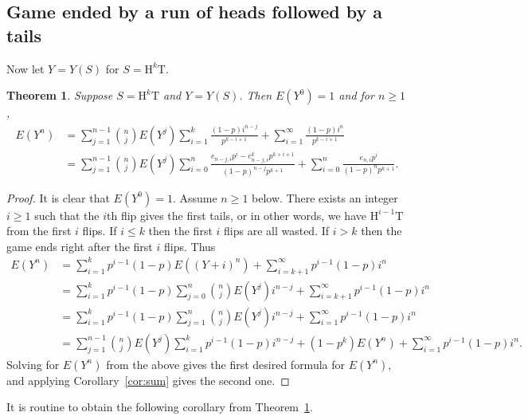 \documentclass[10pt]{amsart}
\newtheorem{theorem}{Theorem}[section]
\theoremstyle{definition}
\theoremstyle{remark}
\newcommand{\HH}{\mathrm{H}} \newcommand{\TT}{\mathrm{T}}
\begin{document}
\subsection{Game ended by a run of heads followed by a tails}
Now let $Y=Y(S)$ for $S=\HH^k\TT$. %


\begin{theorem}\label{thm:HkT}
Suppose $S=\HH^k\TT$ and $Y=Y(S)$. 
Then $E(Y^0)=1$ and for $n\ge1$, 
\begin{align*}
E(Y^n) &= \sum_{j=1}^{n-1} \binom{n}{j} E(Y^j) \sum_{i=1}^k \frac{(1-p) i^{n-j}}{p^{k-i+1}}
+ \sum_{i=1}^\infty \frac{(1-p) i^n}{p^{k-i+1}} \\
&= \sum_{j=1}^{n-1} \binom{n}{j} E(Y^j) \sum_{i=0}^n \frac{e_{n-j,i} p^i - e_{n-j,i}^k p^{k+i+1}}{(1-p)^{n-j}p^{k+1}}
+ \sum_{i=0}^n \frac{e_{n,i}p^i}{(1-p)^n p^{k+1}}.
\end{align*}
\end{theorem}

\begin{proof}
It is clear that $E(Y^0)=1$. Assume $n\ge1$ below.
There exists an integer $i\ge1$ such that the $i$th flip gives the first tails, or in other words, we have $\HH^{i-1}\TT$ from the first $i$ flips.
If $i\le k$ then the first $i$ flips are all wasted.
If $i>k$ then the game ends right after the first $i$ flips.
Thus 
\begin{align*}
E(Y^n) &= \sum_{i=1}^k p^{i-1}(1-p) E((Y+i)^n) + \sum_{i=k+1}^\infty p^{i-1}(1-p) i^n \\
& = \sum_{i=1}^k p^{i-1}(1-p) \sum_{j=0}^n \binom{n}{j} E(Y^j)i^{n-j} + \sum_{i=k+1}^\infty p^{i-1}(1-p) i^n \\
& = \sum_{i=1}^k p^{i-1}(1-p) \sum_{j=1}^n \binom{n}{j} E(Y^j)i^{n-j} + \sum_{i=1}^\infty p^{i-1}(1-p) i^n  \\
&= \sum_{j=1}^{n-1} \binom{n}{j} E(Y^j) \sum_{i=1}^k p^{i-1}(1-p) i^{n-j}
+ (1-p^k) E(Y^n) + \sum_{i=1}^\infty p^{i-1}(1-p) i^n.
\end{align*}
Solving for $E(Y^n)$ from the above gives the first desired formula for $E(Y^n)$, and applying Corollary~\ref{cor:sum} gives the second one.
\end{proof}

It is routine to obtain the following corollary from Theorem~\ref{thm:HkT}.
\end{document}
